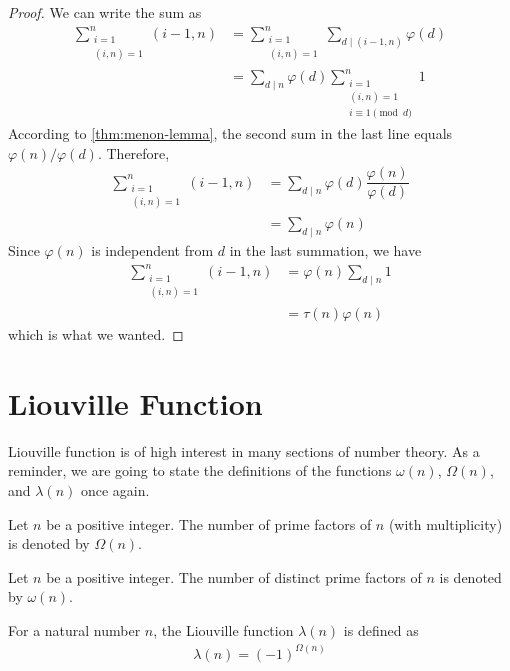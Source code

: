 	\begin{proof}
		We can write the sum as
			\begin{align*}
				\sum\limits_{\substack{i=1\\(i,n)=1}}^{n}(i-1,n)
					& = \sum\limits_{\substack{i=1\\(i,n)=1}}^{n}\sum\limits_{d\mid(i-1,n)}\varphi(d)\\
					& = \sum\limits_{d\mid n}\varphi(d)\sum\limits_{\substack{i=1\\(i,n)=1\\i\equiv 1\pmod d}}^n 1
			\end{align*}
		According to \autoref{thm:menon-lemma}, the second sum in the last line equals $\varphi(n)/\varphi(d)$. Therefore,
			\begin{align*}
				\sum\limits_{\substack{i=1\\(i,n)=1}}^{n}(i-1,n)
					& =  \sum\limits_{d\mid n}\varphi(d)\dfrac{\varphi(n)}{\varphi(d)}\\
					& =  \sum\limits_{d\mid n}\varphi(n)
			\end{align*}
		Since $\varphi(n)$ is independent from $d$ in the last summation, we have
			\begin{align*}
				\sum\limits_{\substack{i=1\\(i,n)=1}}^{n}(i-1,n)
					& =  \varphi(n)\sum\limits_{d\mid n}1\\
					& =  \tau(n)\varphi(n)
			\end{align*}
		which is what we wanted.
	\end{proof}
\section{Liouville Function}
Liouville function is of high interest in many sections of number theory. As a reminder, we are going to state the definitions of the functions $\omega(n)$, $\Omega(n)$, and $\lambda(n)$ once again.

\begin{definition}
	Let $n$ be a positive integer. The number of prime factors of $n$ (with multiplicity) is denoted by $\Omega(n)$.
\end{definition}

\begin{definition}
	Let $n$ be a positive integer. The number of distinct prime factors of $n$ is denoted by $\omega(n)$.
\end{definition}

\begin{definition}
	For a natural number $n$, the Liouville function $\lambda (n)$ is defined as
	\begin{align*}
		\lambda (n) =  (-1)^{\Omega(n)}
	\end{align*}
\end{definition}

